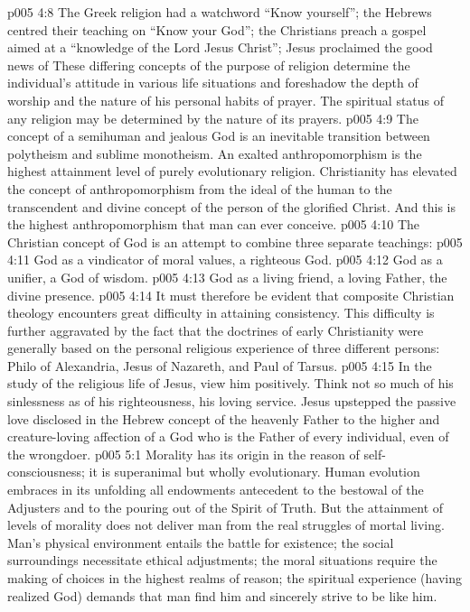 \vs p005 4:8 The Greek religion had a watchword “Know yourself”; the Hebrews centred their teaching on “Know your God”; the Christians preach a gospel aimed at a “knowledge of the Lord Jesus Christ”; Jesus proclaimed the good news of  These differing concepts of the purpose of religion determine the individual’s attitude in various life situations and foreshadow the depth of worship and the nature of his personal habits of prayer. The spiritual status of any religion may be determined by the nature of its prayers.
\vs p005 4:9 \pc The concept of a semihuman and jealous God is an inevitable transition between polytheism and sublime monotheism. An exalted anthropomorphism is the highest attainment level of purely evolutionary religion. Christianity has elevated the concept of anthropomorphism from the ideal of the human to the transcendent and divine concept of the person of the glorified Christ. And this is the highest anthropomorphism that man can ever conceive.
\vs p005 4:10 \pc The Christian concept of God is an attempt to combine three separate teachings:
\vs p005 4:11 \bibnobreakspace {} God as a vindicator of moral values, a righteous God.
\vs p005 4:12 \bibnobreakspace {} God as a unifier, a God of wisdom.
\vs p005 4:13 \bibnobreakspace {} God as a living friend, a loving Father, the divine presence.
\vs p005 4:14 \pc It must therefore be evident that composite Christian theology encounters great difficulty in attaining consistency. This difficulty is further aggravated by the fact that the doctrines of early Christianity were generally based on the personal religious experience of three different persons: Philo of Alexandria, Jesus of Nazareth, and Paul of Tarsus.
\vs p005 4:15 \pc In the study of the religious life of Jesus, view him positively. Think not so much of his sinlessness as of his righteousness, his loving service. Jesus upstepped the passive love disclosed in the Hebrew concept of the heavenly Father to the higher  and creature\hyp{}loving affection of a God who is the Father of every individual, even of the wrongdoer.
\vs p005 5:1 Morality has its origin in the reason of self\hyp{}consciousness; it is superanimal but wholly evolutionary. Human evolution embraces in its unfolding all endowments antecedent to the bestowal of the Adjusters and to the pouring out of the Spirit of Truth. But the attainment of levels of morality does not deliver man from the real struggles of mortal living. Man’s physical environment entails the battle for existence; the social surroundings necessitate ethical adjustments; the moral situations require the making of choices in the highest realms of reason; the spiritual experience (having realized God) demands that man find him and sincerely strive to be like him.
